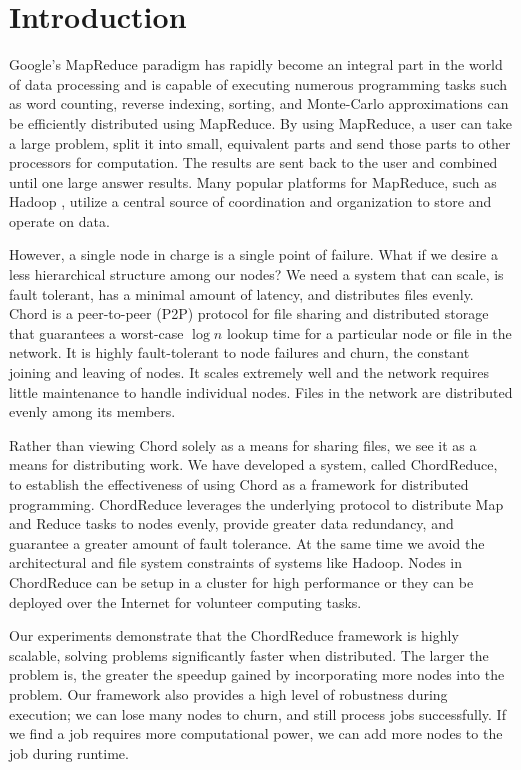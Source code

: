 \documentclass[10pt, conference, compsocconf]{IEEEtran}
\begin{document}
\section{Introduction}
Google's MapReduce \cite{mapreduce} paradigm has rapidly become an integral part in the world of data processing and is capable of executing numerous programming tasks such as word counting, reverse indexing, sorting, and Monte-Carlo approximations can be efficiently distributed using MapReduce.  By using MapReduce, a user can take a large problem, split it into small, equivalent parts and send those parts to other processors for computation.  The results are sent back to the user and combined until one large answer results.  Many popular platforms for MapReduce, such as Hadoop \cite{Hadoop}, utilize a central source of coordination and organization to store and operate on data.

However, a single node in charge is a single point of failure.  What if we desire a less hierarchical structure among our nodes?  We need a system that can scale, is fault tolerant, has a minimal amount of latency, and distributes files evenly.  Chord \cite{Chord} is a peer-to-peer (P2P) protocol for file sharing and distributed storage that guarantees a worst-case $\log n$ lookup time for a particular node or file in the network. It is highly fault-tolerant to node failures and churn, the constant joining and leaving of nodes.  It scales extremely well and the network requires little maintenance to handle individual nodes.  Files in the network are distributed evenly among its members.

Rather than viewing Chord solely as a means for sharing files, we see it as a means for distributing work.  We have developed a system, called ChordReduce, to establish the effectiveness of using Chord as a framework for distributed programming.  ChordReduce leverages the underlying protocol to distribute Map and Reduce tasks to nodes evenly, provide greater data redundancy, and guarantee a greater amount of fault tolerance.   At the same time we avoid the architectural and file system constraints of systems like Hadoop.  Nodes in ChordReduce can be setup in a cluster for high performance or they can be deployed over the Internet for volunteer computing tasks. 

Our experiments demonstrate that the ChordReduce framework is highly scalable, solving problems significantly faster when distributed.  The larger the problem is, the greater the speedup gained by incorporating more nodes into the problem.  Our framework also provides a high level of robustness during execution;  we can lose many nodes to churn, and still process jobs successfully.  If we find a job requires more computational power, we can add more nodes to the job during runtime.
\end{document}
